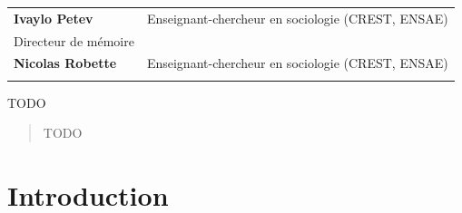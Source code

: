 \documentclass[12pt,a4paper]{reedthesis}
\begin{document}
\begin{titlepage}
\scriptsize
{}
\begin{tabular}{|p{4cm}l}
\textbf{Ivaylo Petev} &  Enseignant-chercheur en sociologie (CREST, ENSAE)\\
Directeur de mémoire & \\
\textbf{Nicolas Robette} &  Enseignant-chercheur en sociologie (CREST, ENSAE)\\
 & \\
\end{tabular}

\end{titlepage}
\addamargin %

\frontmatter %
\pagestyle{empty} %
  \begin{acknowledgements}
    TODO
  \end{acknowledgements}
  \begin{abstract}
    TODO
  \end{abstract}
% 
  \hypersetup{linkcolor=black}
  \setcounter{secnumdepth}{2}
  \setcounter{tocdepth}{2}
  \tableofcontents




\mainmatter %
\pagestyle{fancyplain} %

\hypertarget{introduction}{%
\chapter*{Introduction}\label{introduction}}
\end{document}
